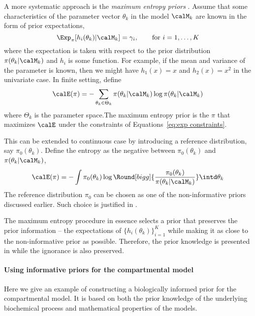 A more systematic approach is the \emph{maximum entropy priors}
\cite{Jaynes:1989vx}. Assume that some characteristics of the parameter vector
$\theta_k$ in the model $\calM_k$ are known in the form of prior expectations,
\begin{equation}
  \Exp_{\pi}[h_i(\theta_k)|\calM_k] = \gamma_i, \qquad\text{for } i =
  1,\dots,K
  \label{eq:exp constraints}
\end{equation}
where the expectation is taken with respect to the prior distribution
$\pi(\theta_k|\calM_k)$ and $h_i$ is some function. For example, if the mean
and variance of the parameter is known, then we might have $h_1(x) = x$ and
$h_2(x) = x^2$ in the univariate case. In finite setting, define
\begin{equation}
  \calE(\pi) = -\sum_{\theta_k\in\Theta_k}
  \pi(\theta_k|\calM_k)\log \pi (\theta_k|\calM_k)
\end{equation}
where $\Theta_k$ is the parameter space.The maximum entropy prior is the
$\pi$ that maximizes $\calE$ under the constraints of Equations~\eqref{eq:exp
  constraints}.

This can be extended to continuous case by introducing a reference
distribution, say $\pi_0(\theta_k)$. Define the entropy as the negative
\kld between $\pi_0(\theta_k)$ and $\pi(\theta_k|\calM_k)$,
\begin{equation}
  \calE(\pi) = -\int \pi_0(\theta_k)\log\Round[bigg]{
    \frac{\pi_0(\theta_k)}{\pi(\theta_k|\calM_k)}}\intd\theta_k
\end{equation}
The reference distribution $\pi_0$ can be chosen as one of the non-informative
priors discussed earlier. Such choice is justified in
\cite[][chap.~9]{Robert:2007tc}.

The maximum entropy procedure in essence selects a prior that preserves the
prior information -- the expectations of $\{h_i(\theta_k)\}_{i=1}^K$ while
making it as close to the non-informative prior as possible. Therefore, the
prior knowledge is presented in while the ignorance is also preserved.

\paragraph{Using informative priors for the \pet compartmental model}

Here we give an example of constructing a biologically informed prior for the
\pet compartmental model. It is based on both the prior knowledge of the
underlying biochemical process and mathematical properties of the models.

